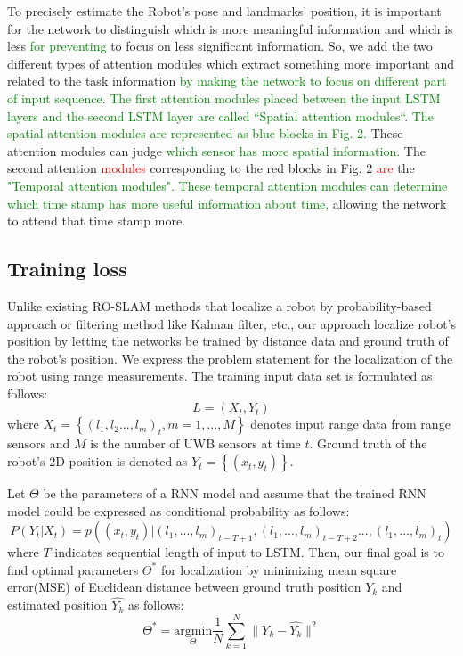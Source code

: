 \documentclass{ieeeaccess}
\begin{document}
To precisely estimate the Robot’s pose and landmarks’ position, it is important for the network to distinguish which is more meaningful information and which is less \textcolor{green}{for preventing} to focus on less significant information. So, we add the two different types of attention modules \cite{luong2015effective} which extract something more important and related to the task information \textcolor{green}{by making the network to focus on different part of input sequence}. \textcolor{green}{The first attention modules placed between the input LSTM layers and the second LSTM layer are called “Spatial attention modules“. The spatial attention modules are represented as blue blocks in Fig. 2.} These attention modules can judge \textcolor{green}{which sensor has more spatial information.} The second attention \textcolor{red}{modules} corresponding to the red blocks in Fig. 2 \textcolor{red}{are} the \textcolor{green}{"Temporal attention modules". These temporal attention modules can determine which time stamp has more useful information about time,} allowing the network to attend that time stamp more.  

\subsection{Training loss}

 Unlike existing RO-SLAM methods that localize a robot by probability-based approach or filtering method like Kalman filter, etc., our approach localize  robot's position by letting the networks be trained by distance data and ground truth of the robot's position. We express the problem statement for the localization of the robot using range measurements. The training input data set is formulated as follows: 
\begin{equation}
L = {(X_t, Y_t)} 
\end{equation}
where $X_t = \left\{(l_1, l_2... , l_m)_t, m = 1,...,M \right \}$ denotes input range data from range sensors and $M$ is the number of UWB sensors at time $t$. Ground truth of the robot's 2D position is denoted as $Y_t = \left\{(x_t, y_t)\right \}$.

Let $\Theta$ be the parameters of a RNN model and assume that the trained RNN model could be expressed as conditional probability as follows:
\begin{equation}
P(Y_t|X_t) = p((x_t, y_t)|(l_1,..., l_m)_{t-T+1},(l_1,..., l_m)_{t-T+2}..., (l_1,..., l_m)_t)
\end{equation}  
where $T$ indicates sequential length of input to LSTM. Then, our final goal is to find optimal parameters $\Theta^{*}$ for localization by minimizing mean square error(MSE) of Euclidean distance between ground truth position $Y_k$ and estimated position $\hat{Y_k}$ as follows:
\begin{equation}
\Theta^{*} = \underset{\Theta}{\mathrm{argmin}} \frac{1}{N} \sum_{k=1}^N \parallel Y_k - \hat{Y_k} \parallel^{2}
\end{equation}  
\end{document}
